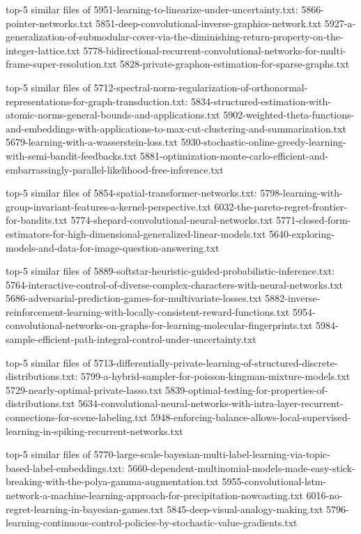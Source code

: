 \documentclass[11pt]{article}
\begin{document}
top-5 similar files of 5951-learning-to-linearize-under-uncertainty.txt:
5866-pointer-networks.txt
5851-deep-convolutional-inverse-graphics-network.txt
5927-a-generalization-of-submodular-cover-via-the-diminishing-return-property-on-the-integer-lattice.txt
5778-bidirectional-recurrent-convolutional-networks-for-multi-frame-super-resolution.txt
5828-private-graphon-estimation-for-sparse-graphs.txt

top-5 similar files of
5712-spectral-norm-regularization-of-orthonormal-representations-for-graph-transduction.txt:
5834-structured-estimation-with-atomic-norms-general-bounds-and-applications.txt
5902-weighted-theta-functions-and-embeddings-with-applications-to-max-cut-clustering-and-summarization.txt
5679-learning-with-a-wasserstein-loss.txt
5930-stochastic-online-greedy-learning-with-semi-bandit-feedbacks.txt
5881-optimization-monte-carlo-efficient-and-embarrassingly-parallel-likelihood-free-inference.txt

top-5 similar files of 5854-spatial-transformer-networks.txt:
5798-learning-with-group-invariant-features-a-kernel-perspective.txt
6032-the-pareto-regret-frontier-for-bandits.txt
5774-shepard-convolutional-neural-networks.txt
5771-closed-form-estimators-for-high-dimensional-generalized-linear-models.txt
5640-exploring-models-and-data-for-image-question-answering.txt

top-5 similar files of
5889-softstar-heuristic-guided-probabilistic-inference.txt:
5764-interactive-control-of-diverse-complex-characters-with-neural-networks.txt
5686-adversarial-prediction-games-for-multivariate-losses.txt
5882-inverse-reinforcement-learning-with-locally-consistent-reward-functions.txt
5954-convolutional-networks-on-graphs-for-learning-molecular-fingerprints.txt
5984-sample-efficient-path-integral-control-under-uncertainty.txt

top-5 similar files of
5713-differentially-private-learning-of-structured-discrete-distributions.txt:
5799-a-hybrid-sampler-for-poisson-kingman-mixture-models.txt
5729-nearly-optimal-private-lasso.txt
5839-optimal-testing-for-properties-of-distributions.txt
5634-convolutional-neural-networks-with-intra-layer-recurrent-connections-for-scene-labeling.txt
5948-enforcing-balance-allows-local-supervised-learning-in-spiking-recurrent-networks.txt

top-5 similar files of
5770-large-scale-bayesian-multi-label-learning-via-topic-based-label-embeddings.txt:
5660-dependent-multinomial-models-made-easy-stick-breaking-with-the-polya-gamma-augmentation.txt
5955-convolutional-lstm-network-a-machine-learning-approach-for-precipitation-nowcasting.txt
6016-no-regret-learning-in-bayesian-games.txt
5845-deep-visual-analogy-making.txt
5796-learning-continuous-control-policies-by-stochastic-value-gradients.txt
\end{document}
